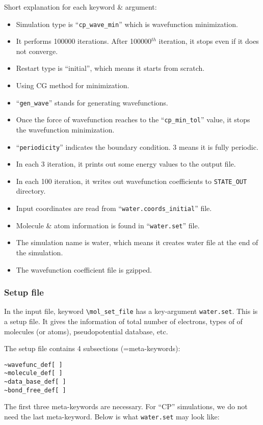 Short explanation for each keyword \& argument:
\begin{itemize}
\item Simulation type is ``\verb+cp_wave_min+'' which is wavefunction minimization.
\item It performs 100000 iterations. After 100000$^{th}$ iteration, it stops even if it does not converge.
\item Restart type is ``initial'', which means it starts from scratch.
\item Using CG method for minimization.
\item ``\verb+gen_wave+'' stands for generating wavefunctions.
\item Once the force of wavefunction reaches to the ``\verb+cp_min_tol+'' value, it stops the wavefunction minimization.
\item ``\verb+periodicity+'' indicates the boundary condition. 3 means it is fully periodic.
\item In each 3 iteration, it prints out some energy values to the output file.
\item In each 100 iteration, it writes out wavefunction coefficients to \verb+STATE_OUT+ directory.
\item Input coordinates are read from ``\verb+water.coords_initial+'' file.
\item Molecule \& atom information is found in ``\verb+water.set+'' file.
\item The simulation name is water, which means it creates water file at the end of the simulation.
\item The wavefunction coefficient file is gzipped.
\end{itemize}


\subsubsection{Setup file}
In the input file, keyword \verb+\mol_set_file+ has a key-argument \verb+water.set+. This is a setup file. It gives the information of total number of electrons, types of of molecules (or atoms), pseudopotential database, etc.

The setup file contains 4 subsections (=meta-keywords):
\begin{verbatim}
~wavefunc_def[ ]
~molecule_def[ ]
~data_base_def[ ]
~bond_free_def[ ]
\end{verbatim}

The first three meta-keywords are necessary. For ``CP'' simulations, we do not need the last meta-keyword. Below is what \verb+water.set+ may look like:

